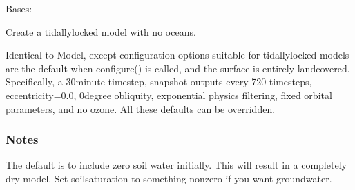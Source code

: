 \documentclass[letterpaper,10pt,english]{sphinxmanual}
\begin{document}
\begin{fulllineitems}
\label{\detokenize{source/exoplasim:exoplasim.TLlandplanet}}
Bases: {\hyperref[\detokenize{source/exoplasim:exoplasim.Model}]{}}

Create a tidally\sphinxhyphen{}locked model with no oceans.

Identical to Model, except configuration options suitable for
tidally\sphinxhyphen{}locked models are the default when configure() is called,
and the surface is entirely land\sphinxhyphen{}covered. Specifically, a 30\sphinxhyphen{}minute
timestep, snapshot outputs every 720 timesteps, eccentricity=0.0,
0\sphinxhyphen{}degree obliquity, exponential physics filtering, fixed orbital
parameters, and no ozone. All these defaults can be overridden.
\subsubsection*{Notes}

The default is to include zero soil water initially. This will result in a completely dry
model. Set soilsaturation to something nonzero if you want groundwater.


\end{fulllineitems}
\end{document}
